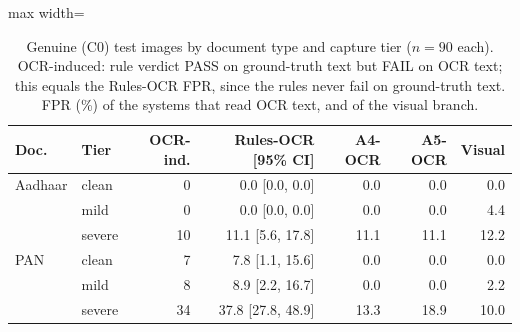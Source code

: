 \documentclass[12pt]{article}
\begin{document}
\begin{table}[H]
\caption{Genuine (C0) test images by document type and capture tier ($n=90$ each). OCR-induced: rule verdict PASS on ground-truth text but FAIL on OCR text; this equals the Rules-OCR FPR, since the rules never fail on ground-truth text. FPR (\%) of the systems that read OCR text, and of the visual branch.}
\label{tab:rq46}
\centering
\scriptsize
\setlength{\tabcolsep}{3pt}
\renewcommand{\arraystretch}{1.06}
\begin{adjustbox}{max width=\linewidth}
\begin{tabular}{@{}l l r r r r r@{}}
\toprule
Doc. & Tier & OCR-ind. & Rules-OCR [95\% CI] & A4-OCR & A5-OCR & Visual \\
\midrule
Aadhaar & clean & 0 & 0.0 {\tiny[0.0, 0.0]} & 0.0 & 0.0 & 0.0 \\
 & mild & 0 & 0.0 {\tiny[0.0, 0.0]} & 0.0 & 0.0 & 4.4 \\
 & severe & 10 & 11.1 {\tiny[5.6, 17.8]} & 11.1 & 11.1 & 12.2 \\
\addlinespace[1.5pt]
PAN & clean & 7 & 7.8 {\tiny[1.1, 15.6]} & 0.0 & 0.0 & 0.0 \\
 & mild & 8 & 8.9 {\tiny[2.2, 16.7]} & 0.0 & 0.0 & 2.2 \\
 & severe & 34 & 37.8 {\tiny[27.8, 48.9]} & 13.3 & 18.9 & 10.0 \\
\bottomrule
\end{tabular}
\end{adjustbox}
\end{table}
\clearpage
\end{document}
